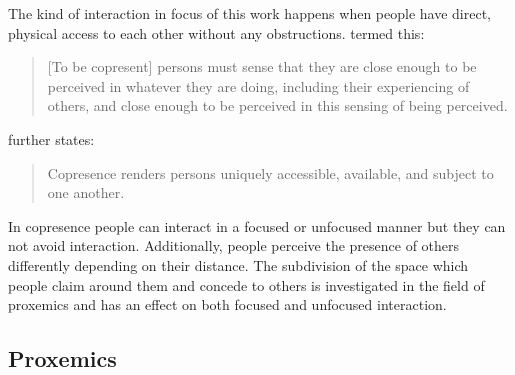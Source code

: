 The kind of interaction in focus of this work happens when people have direct, physical access to each other without any obstructions.
 termed this:
\blockcquote[p. 17]{goffman1963}{[To be copresent] persons must sense that they are close enough to be perceived in whatever they are doing, including their experiencing of others, and close enough to be perceived in this sensing of being perceived.}
 further states:
\blockcquote[p. 22]{goffman1963}{Copresence renders persons uniquely accessible, available, and subject to one another.}.
In \gls{copresence} people can interact in a focused or unfocused manner but they can not avoid interaction.
Additionally, people perceive the presence of others differently depending on their distance.
The subdivision of the space which people claim around them and concede to others is investigated in the field of \gls{proxemics} and has an effect on both focused and \gls{unfocused interaction}.

\subsection{Proxemics}\label{sec.rw.hi.proxemics}


